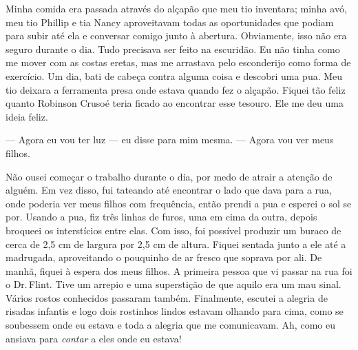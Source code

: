 Minha comida era passada através do
alçapão que meu tio inventara; minha avó, meu tio Phillip e tia Nancy
aproveitavam todas as oportunidades que podiam para subir até ela e
conversar comigo junto à abertura. Obviamente, isso não era seguro
durante o dia. Tudo precisava ser feito na escuridão. Eu não tinha como
me mover com as costas eretas, mas me arrastava pelo esconderijo como
forma de exercício. Um dia, bati de cabeça contra alguma coisa e
descobri uma pua. Meu tio deixara a ferramenta presa onde estava quando
fez o alçapão. Fiquei tão feliz quanto Robinson Crusoé teria ficado ao
encontrar esse tesouro. Ele me deu uma ideia feliz.

--- Agora eu vou ter luz --- eu disse para mim mesma. --- Agora vou ver
meus filhos.

Não ousei começar o trabalho durante o dia, por medo de atrair a atenção
de alguém. Em vez disso, fui tateando até encontrar o lado que dava para
a rua, onde poderia ver meus filhos com frequência, então prendi a pua e
esperei o sol se por. Usando a pua, fiz três linhas de furos, uma em
cima da outra, depois broqueei os interstícios entre elas. Com isso, foi
possível produzir um buraco de cerca de 2,5 cm de largura por 2,5 cm de
altura. Fiquei sentada junto a ele até a madrugada, aproveitando o
pouquinho de ar fresco que soprava por ali. De manhã, fiquei à espera
dos meus filhos. A primeira pessoa que vi passar na rua foi o Dr.\,Flint.
Tive um arrepio e uma superstição de que aquilo era um mau sinal. Vários
rostos conhecidos passaram também. Finalmente, escutei a alegria de
risadas infantis e logo dois rostinhos lindos estavam olhando para cima,
como se soubessem onde eu estava e toda a alegria que me comunicavam.
Ah, como eu ansiava para \emph{contar} a eles onde eu estava!

